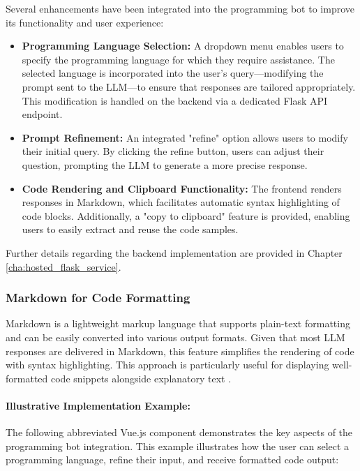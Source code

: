 Several enhancements have been integrated into the programming bot to improve its functionality and user experience:

\begin{itemize}
  \item \textbf{Programming Language Selection:} A dropdown menu enables users to specify the programming language for which they require assistance. The selected language is incorporated into the user’s query—modifying the prompt sent to the LLM—to ensure that responses are tailored appropriately. This modification is handled on the backend via a dedicated Flask API endpoint.
  
  \item \textbf{Prompt Refinement:} An integrated "refine" option allows users to modify their initial query. By clicking the refine button, users can adjust their question, prompting the LLM to generate a more precise response.
  
  \item \textbf{Code Rendering and Clipboard Functionality:} The frontend renders responses in Markdown, which facilitates automatic syntax highlighting of code blocks. Additionally, a "copy to clipboard" feature is provided, enabling users to easily extract and reuse the code samples.
\end{itemize}

Further details regarding the backend implementation are provided in Chapter \ref{cha:hosted_flask_service}.

\subsubsection{Markdown for Code Formatting}

Markdown is a lightweight markup language that supports plain-text formatting and can be easily converted into various output formats. Given that most LLM responses are delivered in Markdown, this feature simplifies the rendering of code with syntax highlighting. This approach is particularly useful for displaying well-formatted code snippets alongside explanatory text \cite{What-Is-Markdown}.

\paragraph{Illustrative Implementation Example:}

The following abbreviated Vue.js component demonstrates the key aspects of the programming bot integration. This example illustrates how the user can select a programming language, refine their input, and receive formatted code output:

